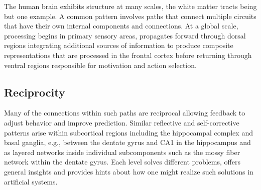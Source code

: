 The human brain exhibits structure at many scales, the white matter tracts being but one example. A common pattern involves paths that connect multiple circuits that have their own internal components and connections. At a global scale, processing begins in primary sensory areas, propagates forward through dorsal regions integrating additional sources of information to produce composite representations that are processed in the frontal cortex before returning through ventral regions responsible for motivation and action selection.


\subsection{Reciprocity}


Many of the connections within such paths are reciprocal allowing feedback to adjust behavior and improve prediction. Similar reflective and self-corrective patterns arise within subcortical regions including the hippocampal complex and basal ganglia, e.g., between the dentate gyrus and CA1 in the hippocampus and as layered networks inside individual subcomponents such as the mossy fiber network within the dentate gyrus. Each level solves different problems, offers general insights and provides hints about how one might realize such solutions in artificial systems.



